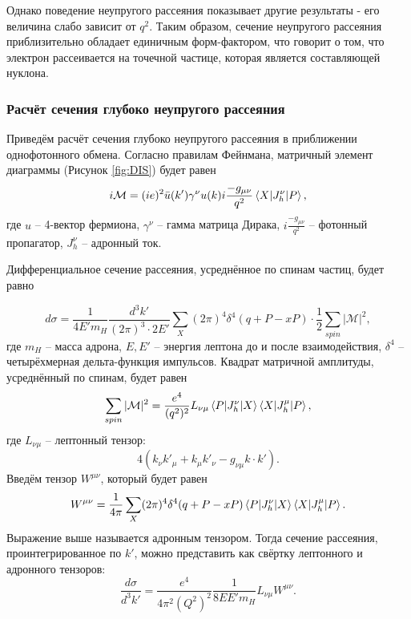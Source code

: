 \documentclass{extarticle}
\begin{document}
Однако поведение неупругого рассеяния показывает другие результаты - его величина слабо зависит от $q^2$. Таким образом, сечение неупругого рассеяния приблизительно обладает единичным форм-фактором, что говорит о том, что электрон рассеивается на точечной частице, которая является составляющей нуклона.

\subsubsection{Расчёт сечения глубоко неупругого рассеяния}

Приведём расчёт сечения глубоко неупругого рассеяния в приближении однофотонного обмена. Согласно правилам Фейнмана, матричный элемент диаграммы (Рисунок \ref{fig:DIS}) будет равен
\begin{equation}
	i\mathcal{M} = (ie)^2 \bar{u}(k')\gamma^\nu u(k) i \frac{-g_{\mu\nu}}{q^2} \braket{X | J_h^\nu | P},
\end{equation}
где $u$ -- 4-вектор фермиона, $\gamma^\nu$ -- гамма матрица Дирака, $i \frac{-g_{\mu\nu}}{q^2}$ -- фотонный пропагатор, $ J_h^\nu $ -- адронный ток. 

Дифференциальное сечение рассеяния, усреднённое по спинам частиц, будет равно

\begin{equation}
	d\sigma = \frac{1}{4E' m_H} \frac{d^3k'}{(2\pi)^3 \cdot 2E'} \sum_X (2\pi)^4 \delta^4(q+P-xP) \cdot \frac{1}{2} \sum_{spin} |\mathcal{M}|^2,
\end{equation}
где $m_H$ -- масса адрона, $E, E'$ -- энергия лептона до и после взаимодействия, $\delta^4$ -- четырёхмерная дельта-функция импульсов. Квадрат матричной амплитуды, усреднённый по спинам, будет равен
\begin{equation}
	\sum_{spin} |\mathcal{M}|^2 = \frac{e^4}{(q^2)^2}L_{\nu \mu}\braket{P | J_h^\nu | X} \braket{X | J_h^\mu | P}, 
\end{equation}
где $L_{\nu\mu}$ -- лептонный тензор:
\begin{equation}
	4 (k_\nu k'_\mu + k_\mu k'_\nu - g_{\nu\mu}k\cdot k').
\end{equation}
Введём тензор $W^{\mu\nu}$, который будет равен
\begin{equation}
	W^{\mu\nu} = \frac{1}{4\pi} \sum_X (2\pi)^4 \delta^4(q+P-xP) \braket{P | J_h^\nu | X} \braket{X | J_h^\mu | P}.
\end{equation}
Выражение выше называется адронным тензором. Тогда сечение рассеяния, проинтегрированное по $k'$, можно представить как свёртку лептонного и адронного тензоров:
\begin{equation}
	\frac{d\sigma}{d^3 k'} = \frac{e^4}{4\pi^2(Q^2)^2} \frac{1}{8EE'm_H}L_{\nu\mu}W^{\mu\nu}.
\end{equation}
\end{document}
